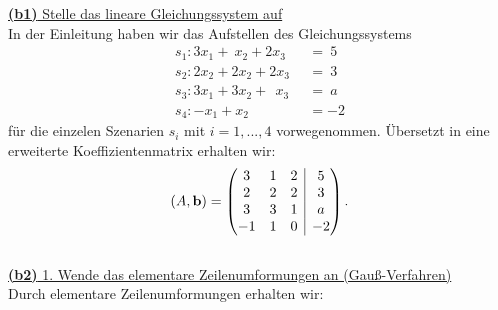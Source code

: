 \underline{\textbf{(b1)} Stelle das lineare Gleichungssystem auf}\\
In der Einleitung haben wir das Aufstellen des Gleichungssystems
\begin{align*}
	s_1 : 3x_1 +  \ x_2 + 2 x_3 \ &=\ 5\\
	s_2 : 2x_2 + 2 x_2 + 2 x_3 \ &= \ 3\\
	s_3 : 3x_1 + 3x_2 + \ \ x_3 \ &= \ a \ \\
	s_4 : -x_1 + x_2 \qquad \quad \ \ &= -2
\end{align*}
für die einzelen Szenarien $s_i$ mit $i = 1,...,4$ vorwegenommen.
Übersetzt in eine erweiterte Koeffizientenmatrix erhalten wir:
\begin{align*}
	(A,\mathbf{b})
	=
	\begin{pmatrix}
		3 & 1 & 2 & \BAR & 5\\
		2 & 2 & 2 & \BAR & 3\\
		3 & 3 & 1 & \BAR & a \\
		-1 & 1 & 0 & \BAR & -2
	\end{pmatrix}.
\end{align*}
\ \\
\underline{\textbf{(b2)} 1. Wende das elementare Zeilenumformungen an (Gauß-Verfahren)}\\
Durch elementare Zeilenumformungen erhalten wir:
